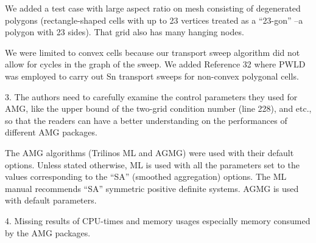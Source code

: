 \documentclass{article}
\begin{document}
We added a test case with large aspect ratio on mesh consisting of degenerated polygons (rectangle-shaped cells with up to 23 vertices treated as a ``23-gon'' --a polygon with 23 sides). That grid also has many hanging nodes.

We were limited to convex cells because our transport sweep algorithm did not allow for cycles in the graph of the sweep. We added Reference 32 where PWLD was employed to carry out Sn transport sweeps for non-convex polygonal cells. %

\bigskip


{
\color{blue}
3. The authors need to carefully examine the control parameters they used for AMG, like the upper bound of the two-grid condition number (line 228), and etc., so that the readers can have a better understanding on the performances of different AMG packages.
}

The AMG algorithms (Trilinos ML and AGMG) were used with their default options. Unless stated otherwise, ML is
used with all the parameters set to the values corresponding to the ``SA'' (smoothed aggregation) options. The ML manual recommends ``SA'' symmetric positive definite systems.
AGMG is used with default parameters. 


\bigskip


{
\color{blue}
4. Missing results of CPU-times and memory usages especially memory consumed by the AMG packages.
}
\end{document}
